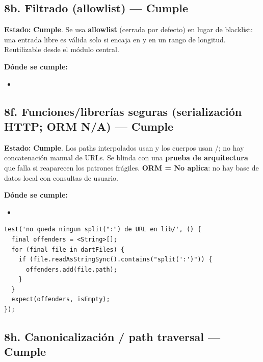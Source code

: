 \documentclass[11pt,a4paper]{article}
\newcommand{\Cumple}{\textcolor{cumpleColor}{\textbf{Cumple}}}
\begin{document}
\subsection{8b. Filtrado (allowlist) --- \Cumple}

\textbf{Estado:} \Cumple. Se usa \textbf{allowlist} (cerrada por defecto) en lugar de blacklist: una entrada libre es válida solo si encaja en \texttt{} y en un rango de longitud. Reutilizable desde el módulo central.

\textbf{Dónde se cumple:}
\begin{itemize}[leftmargin=1.2cm,nosep]
\item \texttt{}
\end{itemize}

\subsection{8f. Funciones/librerías seguras (serialización HTTP; ORM N/A) --- \Cumple}

\textbf{Estado:} \Cumple. Los paths interpolados usan \texttt{} y los cuerpos usan \texttt{}/\texttt{}; no hay concatenación manual de URLs. Se blinda con una \textbf{prueba de arquitectura} que falla si reaparecen los patrones frágiles. \textbf{ORM = No aplica}: no hay base de datos local con consultas de usuario.

\textbf{Dónde se cumple:}
\begin{itemize}[leftmargin=1.2cm,nosep]
\item \texttt{}
\end{itemize}

\begin{lstlisting}[style=dartstyle,caption={Prueba de arquitectura que impide regresiones (safe\_http\_serialization\_test.dart)}]
test('no queda ningun split(":") de URL en lib/', () {
  final offenders = <String>[];
  for (final file in dartFiles) {
    if (file.readAsStringSync().contains("split(':')")) {
      offenders.add(file.path);
    }
  }
  expect(offenders, isEmpty);
});
\end{lstlisting}

\subsection{8h. Canonicalización / path traversal --- \Cumple}
\end{document}
